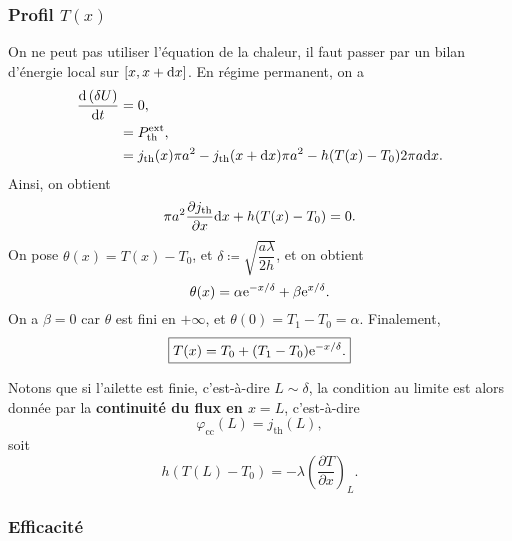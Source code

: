         \subsubsection{Profil $T(x)$}

            On ne peut pas utiliser l'équation de la chaleur, il faut passer par un bilan d'énergie local sur $[x,x+\mathrm{d} x]$. En régime permanent, on a 
            \begin{align*}
                \frac{\mathrm{d}\left(\delta U\right)}{\mathrm{d} t}
                &=
                0,\\
                &=
                P_{\text{th}}^{\text{ext}},\\
                &=
                j_{\text{th}}(x)\pi a^{2}-j_{\text{th}}(x+\mathrm{d} x)\pi a^{2}-h(T(x)-T_0)2\pi a\mathrm{d} x.
            \end{align*}
            Ainsi, on obtient
            \begin{equation*}
                \pi a^{2}\frac{\partial j_{\text{th}}}{\partial x}\mathrm{d} x+h(T(x)-T_0)=0.
            \end{equation*}
            On pose $\theta(x)=T(x)-T_0$, et $\delta\coloneqq\sqrt{\dfrac{a\lambda}{2h}}$, et on obtient 
            \begin{equation*}
                \theta(x)=\alpha\mathrm{e}^{-x/\delta}+\beta\mathrm{e}^{x/\delta}.
            \end{equation*}
            On a $\beta =0$ car $\theta$ est fini en $+\infty$, et $\theta(0)=T_1-T_0=\alpha$. Finalement,
            \begin{equation*}
                \boxed{
                    T(x)=T_0+(T_1-T_0)\mathrm{e}^{-x/\delta}.
                }
            \end{equation*}

            Notons que si l'ailette est \og finie\fg, c'est-à-dire $L\sim\delta$, la condition au limite est alors donnée par la \textbf{continuité du flux en $x=L$}, c'est-à-dire 
            \begin{equation*}
                \varphi_{\text{cc}}(L)=j_{\text{th}}(L),
            \end{equation*}
            soit
            \begin{equation*}
                \boxed{
                    h(T(L)-T_0)=-\lambda\left(\frac{\partial T}{\partial x}\right)_{L}.
                }
            \end{equation*}

        \subsubsection{Efficacité}

